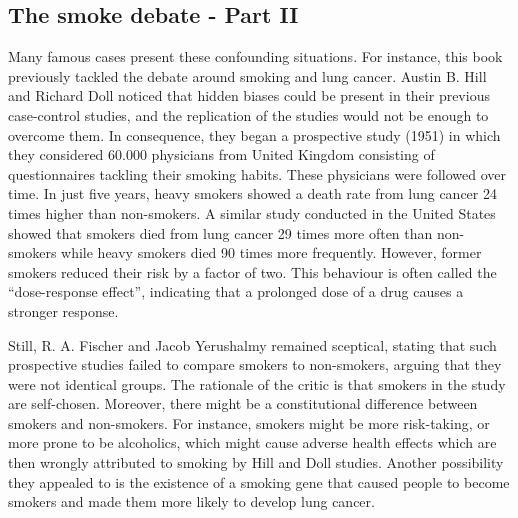 \documentclass[
]{book}
\begin{document}
\hypertarget{the-smoke-debate---part-ii}{%
\subsection{The smoke debate - Part II}\label{the-smoke-debate---part-ii}}

Many famous cases present these confounding situations. For instance, this book previously tackled the debate around smoking and lung cancer. Austin B. Hill and Richard Doll noticed that hidden biases could be present in their previous case-control studies, and the replication of the studies would not be enough to overcome them. In consequence, they began a prospective study (1951) in which they considered 60.000 physicians from United Kingdom consisting of questionnaires tackling their smoking habits. These physicians were followed over time. In just five years, heavy smokers showed a death rate from lung cancer 24 times higher than non-smokers. A similar study conducted in the United States showed that smokers died from lung cancer 29 times more often than non-smokers while heavy smokers died 90 times more frequently. However, former smokers reduced their risk by a factor of two. This behaviour is often called the ``dose-response effect'', indicating that a prolonged dose of a drug causes a stronger response.

Still, R. A. Fischer and Jacob Yerushalmy remained sceptical, stating that such prospective studies failed to compare smokers to non-smokers, arguing that they were not identical groups. The rationale of the critic is that smokers in the study are self-chosen. Moreover, there might be a constitutional difference between smokers and non-smokers. For instance, smokers might be more risk-taking, or more prone to be alcoholics, which might cause adverse health effects which are then wrongly attributed to smoking by Hill and Doll studies. Another possibility they appealed to is the existence of a smoking gene that caused people to become smokers and made them more likely to develop lung cancer.
\end{document}

